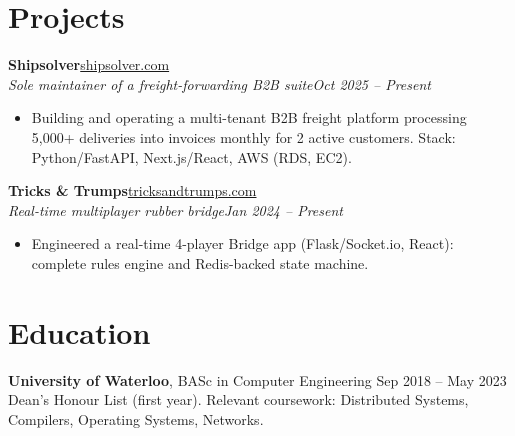 \documentclass[letterpaper,10pt]{article}
\newcommand{\role}[4]{%
  \noindent\textbf{#1}\hfill #2\\[1pt]%
  \textit{#3}\hfill \textit{#4}\par%
}
\newenvironment{bullets}{%
  \begin{itemize}[leftmargin=1.5em,topsep=2pt,itemsep=1pt,parsep=0pt]%
}{\end{itemize}}
\begin{document}
\section{Projects}

\role{Shipsolver}{\href{https://shipsolver.com}{shipsolver.com}}{Sole maintainer of a freight-forwarding B2B suite}{Oct 2025 -- Present}
\begin{bullets}
  \item Building and operating a multi-tenant B2B freight platform processing 5,000+ deliveries into invoices monthly for 2 active customers. Stack: Python/FastAPI, Next.js/React, AWS (RDS, EC2).
\end{bullets}

\vspace{3pt}
\role{Tricks \& Trumps}{\href{https://tricksandtrumps.com}{tricksandtrumps.com}}{Real-time multiplayer rubber bridge}{Jan 2024 -- Present}
\begin{bullets}
  \item Engineered a real-time 4-player Bridge app (Flask/Socket.io, React): complete rules engine and Redis-backed state machine.
\end{bullets}

\section{Education}
\noindent\textbf{University of Waterloo}, BASc in Computer Engineering \hfill Sep 2018 -- May 2023\\
Dean's Honour List (first year). Relevant coursework: Distributed Systems, Compilers, Operating Systems, Networks.
\end{document}
